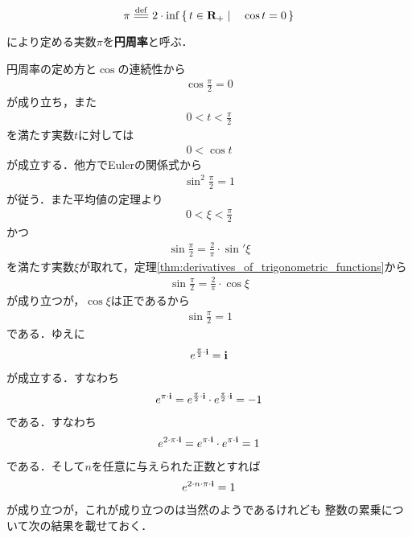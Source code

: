 	\begin{screen}
		\begin{dfn}[円周率]
			\begin{align}
				\pi \defeq 2 \cdot \inf{}{\Set{t \in \R_+}{\cos{t} = 0}}
			\end{align}
			により定める実数$\pi$を{\bf 円周率}と呼ぶ．
		\end{dfn}
	\end{screen}
	
	円周率の定め方と$\cos$の連続性から
	\begin{align}
		\cos{\frac{\pi}{2}} = 0
	\end{align}
	が成り立ち，また
	\begin{align}
		0 < t < \frac{\pi}{2}
	\end{align}
	を満たす実数$t$に対しては
	\begin{align}
		0 < \cos{t}
	\end{align}
	が成立する．他方でEulerの関係式から
	\begin{align}
		\sin^2{\frac{\pi}{2}} = 1
	\end{align}
	が従う．また平均値の定理より
	\begin{align}
		0 < \xi < \frac{\pi}{2}
	\end{align}
	かつ
	\begin{align}
		\sin{\frac{\pi}{2}}
		= \frac{2}{\pi} \cdot \sin'{\xi}
	\end{align}
	を満たす実数$\xi$が取れて，定理\ref{thm:derivatives_of_trigonometric_functions}から
	\begin{align}
		\sin{\frac{\pi}{2}}
		= \frac{2}{\pi} \cdot \cos{\xi}
	\end{align}
	が成り立つが，$\cos{\xi}$は正であるから
	\begin{align}
		\sin{\frac{\pi}{2}} = 1
	\end{align}
	である．ゆえに
	\begin{align}
		e^{\frac{\pi}{2} \cdot \mathbf{i}} = \mathbf{i}
	\end{align}
	が成立する．すなわち
	\begin{align}
		e^{\pi \cdot \mathbf{i}}
		= e^{\frac{\pi}{2} \cdot \mathbf{i}} \cdot e^{\frac{\pi}{2} \cdot \mathbf{i}}
		= -1
	\end{align}
	である．すなわち
	\begin{align}
		e^{2 \cdot \pi \cdot \mathbf{i}}
		= e^{\pi \cdot \mathbf{i}} \cdot e^{\pi \cdot \mathbf{i}}
		= 1
	\end{align}
	である．そして$n$を任意に与えられた正数とすれば
	\begin{align}
		e^{2 \cdot n \cdot \pi \cdot \mathbf{i}} = 1
	\end{align}
	が成り立つが，これが成り立つのは当然のようであるけれども
	整数の累乗について次の結果を載せておく．
	
